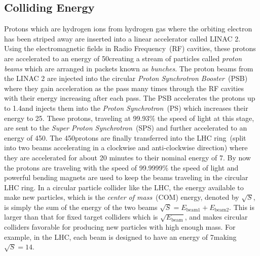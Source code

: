 \subsection{Colliding Energy}
Protons which are hydrogen ions from hydrogen gas where the orbiting electron has been striped away are inserted into a linear accelerator called LINAC 2.
Using the electromagnetic fields in Radio Frequency~(RF) cavities, these protons are accelerated to an energy of 50\MeV creating a stream of particles called \textit{proton beams} which are arranged in packets known as \textit{bunches}. The proton beams from the LINAC 2 are injected into the circular \textit{Proton Synchrotron Booster}~(PSB) where they gain acceleration as the pass many times through the RF cavities with their energy increasing after each pass. The PSB accelerates the protons up to 1.4\GeV and injects them into the \textit{Proton Synchrotron}~(PS) which increases their energy to 25\GeV. These protons, traveling at 99.93\% the speed of light at this stage, are sent to the \textit{Super Proton Synchrotron}~(SPS) and further accelerated to an energy of 450\GeV. The 450\GeV protons are finally transferred into the LHC ring~(split into two beams accelerating in a clockwise and anti-clockwise direction) where they are accelerated for about 20 minutes to their nominal energy of 7\TeV. By now the protons are traveling with the speed of 99.9999\% the speed of light and powerful bending magnets are used to keep the beams traveling in the circular LHC ring.
\newline
In a circular particle collider like the LHC, the energy available to make new particles, which is the \textit{center of mass}~(COM) energy, denoted by $\sqrt{S}$, is simply the sum of the energy of the two beams \ie $\sqrt{S} = \mathit{E}_{\mbox{beam1}} + \mathit{E}_{\mbox{beam2}}$. This is larger than that for fixed target colliders which is $\sqrt{\mathit{E}_{\mbox{beam}}}$, and makes circular colliders favorable for producing new particles with high enough mass. For example, in the LHC, each beam is designed to have an energy of 7\TeV  making $\sqrt{S} = 14$\TeV.

